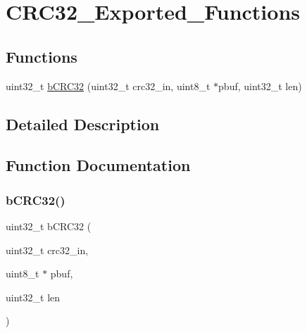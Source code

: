 \hypertarget{group___c_r_c32___exported___functions}{}\section{C\+R\+C32\+\_\+\+Exported\+\_\+\+Functions}
\label{group___c_r_c32___exported___functions}
\subsection*{Functions}
\begin{DoxyCompactItemize}
\item 
uint32\+\_\+t \mbox{\hyperlink{group___c_r_c32___exported___functions_ga1241396f94eb8cb24a6ca84a8e030b65}{b\+C\+R\+C32}} (uint32\+\_\+t crc32\+\_\+in, uint8\+\_\+t $\ast$pbuf, uint32\+\_\+t len)
\end{DoxyCompactItemize}


\subsection{Detailed Description}


\subsection{Function Documentation}
\mbox{\label{group___c_r_c32___exported___functions_ga1241396f94eb8cb24a6ca84a8e030b65}} 
\subsubsection{\texorpdfstring{b\+C\+R\+C32()}{bCRC32()}}
{\footnotesize\ttfamily uint32\+\_\+t b\+C\+R\+C32 (\begin{DoxyParamCaption}\item[{uint32\+\_\+t}]{crc32\+\_\+in,  }\item[{uint8\+\_\+t $\ast$}]{pbuf,  }\item[{uint32\+\_\+t}]{len }\end{DoxyParamCaption})}

